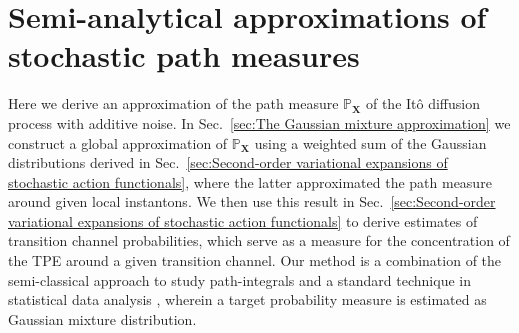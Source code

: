 \section{Semi-analytical approximations of stochastic path measures} \label{sec:Semi-analytical approximations of stochastic path measures}

Here we derive an approximation of the path measure $\mathbb{P}_\mathbf{X}$ of the It\^{o} diffusion process with additive noise. In Sec.~\ref{sec:The Gaussian mixture approximation} we construct a global approximation of $\mathbb{P}_\mathbf{X}$ using a weighted sum of the Gaussian distributions derived in Sec.~\ref{sec:Second-order variational expansions of stochastic action functionals}, where the latter approximated the path measure around given local instantons. We then use this result in Sec.~\ref{sec:Second-order variational expansions of stochastic action functionals} to derive estimates of transition channel probabilities, which serve as a measure for the concentration of the TPE around a given transition channel. Our method is a combination of the semi-classical approach to study path-integrals \citep{chaichianPathIntegralsPhysics2001, schulmanTechniquesApplicationsPath1996, smirnovEstimationPathIntegral2010, moretteDefinitionApproximationFeynman1951, marinovPathIntegralsQuantum1980, sakuraiModernQuantumMechanics2017} and a standard technique in statistical data analysis \citep{gelmanBayesianDataAnalysis, scottMultivariateDensityEstimation2015, goodfellowDeepLearning2016, nguyenApproximationFiniteMixtures2020, perpinanModefindingMixturesGaussian2000}, wherein a target probability measure is estimated as Gaussian mixture distribution. 

